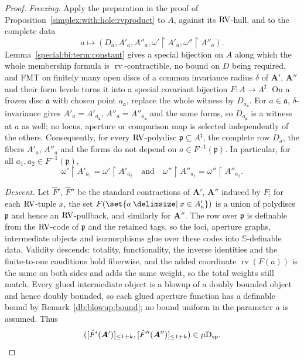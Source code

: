 \documentclass[12pt]{amsart}
\theoremstyle{plain}
\theoremstyle{definition}
\theoremstyle{remark}
\numberwithin{equation}{section}
\theoremstyle{plain}
\newcommand{\RV}{\textup{RV}}
\newcommand{\dand}{\quad \text{and} \quad}
\newcommand{\ga}{\mathfrak{a}}
\newcommand{\gp}{\mathfrak{p}}
\newcommand{\0}{\emptyset}
\newcommand{\rest}{\upharpoonright}
\newcommand{\fun}{\longrightarrow}
\newcommand{\efun}{\longmapsto}
\newcommand{\sub}{\subseteq}
\providecommand\given{}
\newcommand\SetSymbol[1][]{%
\nonscript \: #1 \vert
\allowbreak
\nonscript\:
\mathopen{}}
\renewcommand\given{\SetSymbol[\delimsize]}
\newcommand{\dsp}{\textup{D}_{\textup{sp}}}
\newcommand{\mispdb}{\mu \dsp}
\DeclareMathOperator{\rv}{rv}
\begin{document}
\begin{proof}
\emph{Freezing.} Apply the preparation in the proof of Proposition~\ref{simplex:with:hole:rvproduct} to $A$, against its $\RV$-hull, and to the complete data
\[
a \efun (D_a, A'_a, A''_a, \omega' \rest A'_a, \omega'' \rest A''_a).
\]
Lemma~\ref{special:bi:term:constant} gives a special bijection on $A$ along which the whole membership formula is $\rv$-contractible, no bound on $D$ being required, and FMT on finitely many open discs of a common invariance radius $\delta$ of $\bm A'$, $\bm A''$ and their form levels turns it into a special covariant bijection $F : A \fun A^\sharp$. On a frozen disc $\ga$ with chosen point $a_\ga$, replace the whole witness by $D_{a_\ga}$. For $a \in \ga$, $\delta$-invariance gives $A'_a = A'_{a_\ga}$, $A''_a = A''_{a_\ga}$ and the same forms, so $D_{a_\ga}$ is a witness at $a$ as well; no locus, aperture or comparison map is selected independently of the others. Consequently, for every $\RV$-polydisc $\gp \sub A^\sharp$, the complete row $D_a$, the fibers $A'_a$, $A''_a$ and the forms do not depend on $a \in F^{-1}(\gp)$. In particular, for all $a_1, a_2 \in F^{-1}(\gp)$,
\[
\omega' \rest A'_{a_1} = \omega' \rest A'_{a_2} \dand \omega'' \rest A''_{a_1} = \omega'' \rest A''_{a_2}.
\]

\emph{Descent.} Let $\hat F'$, $\hat F''$ be the standard contractions of $\bm A'$, $\bm A''$ induced by $F$; for each $\RV$-tuple $x$, the set $F(\set{a \given x \in A'_a})$ is a union of polydiscs $\gp$ and hence an $\RV$-pullback, and similarly for $\bm A''$. The row over $\gp$ is definable from the $\RV$-code of $\gp$ and the retained tags, so the loci, aperture graphs, intermediate objects and isomorphisms glue over these codes into $\mathbb S$-definable data. Validity descends: totality, functionality, the inverse identities and the finite-to-one conditions hold fiberwise, and the added coordinate $\rv(F(a))$ is the same on both sides and adds the same weight, so the total weights still match. Every glued intermediate object is a blowup of a doubly bounded object and hence doubly bounded, so each glued aperture function has a definable bound by Remark~\ref{db:blowup:bound}; no bound uniform in the parameter $a$ is assumed. Thus
\[
([\hat F'(\bm A')]_{\leq 1+k}, [\hat F''(\bm A'')]_{\leq 1+k}) \in \mispdb.
\]


\end{proof}
\end{document}
